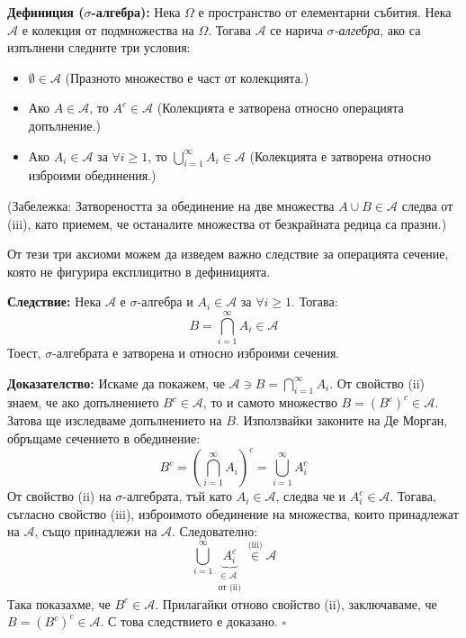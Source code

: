 \documentclass{article}
\begin{document}
\textbf{Дефиниция ($\sigma$-алгебра):}
Нека $\Omega$ е пространство от елементарни събития. Нека $\mathcal{A}$ е колекция от подмножества на $\Omega$. Тогава $\mathcal{A}$ се нарича \emph{$\sigma$-алгебра}, ако са изпълнени следните три условия:

\begin{itemize}
    \item[(i)] $\emptyset \in \mathcal{A}$ \quad (Празното множество е част от колекцията.)
    \item[(ii)] Ако $A \in \mathcal{A}$, то $A^c \in \mathcal{A}$ \quad (Колекцията е затворена относно операцията допълнение.)
    \item[(iii)] Ако $A_i \in \mathcal{A}$ за $\forall i \ge 1$, то $\bigcup_{i=1}^{\infty} A_i \in \mathcal{A}$ \quad (Колекцията е затворена относно изброими обединения.)
\end{itemize}
(Забележка: Затвореността за обединение на две множества $A \cup B \in \mathcal{A}$ следва от (iii), като приемем, че останалите множества от безкрайната редица са празни.)

От тези три аксиоми можем да изведем важно следствие за операцията сечение, която не фигурира експлицитно в дефиницията.

\textbf{Следствие:}
Нека $\mathcal{A}$ е $\sigma$-алгебра и $A_i \in \mathcal{A}$ за $\forall i \ge 1$. Тогава:
\[
B = \bigcap_{i=1}^{\infty} A_i \in \mathcal{A}
\]
Тоест, $\sigma$-алгебрата е затворена и относно изброими сечения.

\textbf{Доказателство:}
Искаме да покажем, че $\mathcal{A} \ni B = \bigcap_{i=1}^{\infty} A_i$.
От свойство (ii) знаем, че ако допълнението $B^c \in \mathcal{A}$, то и самото множество $B = (B^c)^c \in \mathcal{A}$. Затова ще изследваме допълнението на $B$. Използвайки законите на Де Морган, обръщаме сечението в обединение:
\[
B^c = \left( \bigcap_{i=1}^{\infty} A_i \right)^c = \bigcup_{i=1}^{\infty} A_i^c
\]
От свойство (ii) на $\sigma$-алгебрата, тъй като $A_i \in \mathcal{A}$, следва че и $A_i^c \in \mathcal{A}$.
Тогава, съгласно свойство (iii), изброимото обединение на множества, които принадлежат на $\mathcal{A}$, също принадлежи на $\mathcal{A}$. Следователно:
\[
\bigcup_{i=1}^{\infty} \underbrace{A_i^c}_{\substack{\in \mathcal{A} \\ \text{от (ii)}}} \stackrel{\text{(iii)}}{\in} \mathcal{A}
\]
Така показахме, че $B^c \in \mathcal{A}$. Прилагайки отново свойство (ii), заключаваме, че $B = (B^c)^c \in \mathcal{A}$. С това следствието е доказано. $\square$
\end{document}
